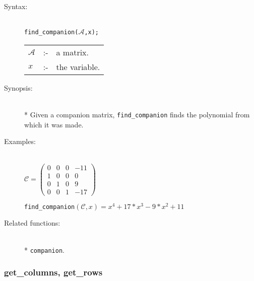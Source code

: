 \begin{description}
\item[Syntax:]\mbox{}\\
\texttt{find\_companion($\mathcal{A}$,x);}\\[2mm]
\begin{tabular}{l l l}
$\mathcal{A}$ &:-& a matrix. \\
$x$          &:-& the variable.
\end{tabular}

\item[Synopsis:]\mbox{}\\*
  Given a companion matrix, \texttt{find\_companion} finds the polynomial
from which it was made.

\item[Examples:]\mbox{}\\
  \(\mathcal{C} = \begin{pmatrix} 0 & 0 & 0 & -11 \\ 1 & 0 & 0 & 0
    \\ 0 & 1 & 0 & 9 \\ 0 & 0 & 1 & -17 \end{pmatrix}\)

  \texttt{find\_companion}\((\mathcal{C},x) = x^4+17*x^3-9*x^2+11\)

\item[Related functions:]\mbox{}\\*
\texttt{companion}.
\end{description}

\subsubsection{get\_columns, get\_rows}
\label{linalg:get_columns}

